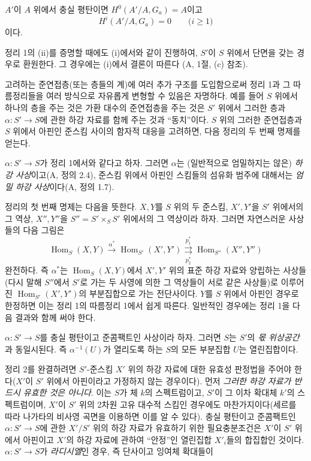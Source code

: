  $A'$이 $A$ 위에서 충실 평탄이면
$H^0(A'/A,G_a)=A$이고
\[
  H^i(A'/A,G_a)=0\qquad\text{($i\geq1$)}
\]
이다.

정리 1의 (ii)를 증명할 때에도 (i)에서와 같이 진행하여, $S'$이 $S$
위에서 단면을 갖는 경우로 환원한다. 그 경우에는 (i)에서 결론이 따른다
(A, 1절, (c) 참조).

고려하는 준연접층(또는 층들의 계)에 여러 추가 구조를 도입함으로써
정리 1과 그 따름정리들을 여러 방식으로 자유롭게 변형할 수 있음은
자명하다. 예를 들어 $S$ 위에서 하나의 층을 주는 것은
가환 대수의 준연접층을 주는 것은 $S'$ 위에서 그러한 층과
$\alpha:S'\longrightarrow S$에 관한 하강 자료를 함께 주는 것과
“동치”이다. $S$ 위의 그러한 준연접층과 $S$ 위에서 아핀인
준스킴 사이의 함자적 대응을 고려하면, 다음 정리의 두 번째 명제를
얻는다.

 $\alpha:S'\longrightarrow S$가 정리 1에서와 같다고
하자. 그러면 $\alpha$는 (일반적으로 엄밀하지는 않은)
\emph{하강 사상}이고(A, 정의 2.4), 준스킴 위에서 아핀인 스킴들의
섬유화 범주에 대해서는 \emph{엄밀 하강 사상}이다(A, 정의 1.7).

정리의 첫 번째 명제는 다음을 뜻한다. $X,Y$를 $S$ 위의 두 준스킴,
$X',Y'$을 $S'$ 위에서의 그 역상, $X'',Y''$을
$S''=S'\times_SS'$ 위에서의 그 역상이라 하자. 그러면 자연스러운
사상들의 다음 그림은
\[
  \operatorname{Hom}_S(X,Y)\xrightarrow{\alpha^*}
  \operatorname{Hom}_{S'}(X',Y')
  \underset{p_2^*}{\overset{p_1^*}{\rightrightarrows}}
  \operatorname{Hom}_{S''}(X'',Y'')
\]
완전하다. 즉 $\alpha^*$는 $\operatorname{Hom}_S(X,Y)$에서
$X',Y'$ 위의 표준 하강 자료와 양립하는 사상들(다시 말해 $S''$에서
$S'$로 가는 두 사영에 의한 그 역상들이 서로 같은 사상들)로 이루어진
$\operatorname{Hom}_{S'}(X',Y')$의 부분집합으로 가는 전단사이다.
$Y$를 $S$ 위에서 아핀인 경우로 한정하면 이는 정리 1의 따름정리 1에서
쉽게 따른다. 일반적인 경우에는 정리 1을 다음 결과와 함께 써야 한다.

 $\alpha:S'\longrightarrow S$를 충실 평탄이고
준콤팩트인 사상이라 하자. 그러면 $S$는 $S'$의 \emph{몫 위상공간}과
동일시된다. 즉 $\alpha^{-1}(U)$가 열리도록 하는 $S$의 모든 부분집합
$U$는 열린집합이다.

정리 2를 완결하려면 $S'$-준스킴 $X'$ 위의 하강 자료에 대한 유효성
판정법을 주어야 한다($X'$이 $S'$ 위에서 아핀이라고 가정하지 않는
경우이다). 먼저 \emph{그러한 하강 자료가 반드시 유효한 것은
아니다}. 이는 $S$가 체 $k$의 스펙트럼이고, $S'$이 그 이차 확대체
$k'$의 스펙트럼이며, $X'$이 $S'$ 위의 2차원 고유 대수적 스킴인
경우에도 마찬가지이다(세르를 따라 나가타의 비사영 곡면을 이용하면
이를 알 수 있다). 충실 평탄이고 준콤팩트인
$\alpha:S'\longrightarrow S$에 관한 $X'/S'$ 위의 하강 자료가
유효하기 위한 필요충분조건은 $X'$이 $S'$ 위에서 아핀이고 $X'$의
하강 자료에 관하여 “안정”인 열린집합 $X'_i$들의 합집합인
것이다. $\alpha:S'\longrightarrow S$가 \emph{라디시엘}인 경우,
즉 단사이고 잉여체 확대들이

